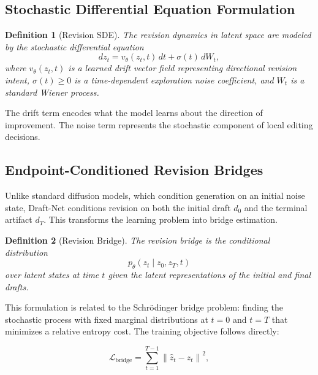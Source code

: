 \documentclass[12pt,a4paper]{article}
\theoremstyle{draftthm}
\newtheorem{definition}{Definition}[section]
\newcommand{\vtheta}{v_{\theta}}
\newcommand{\norm}[1]{\left\|#1\right\|}
\newcommand{\ptheta}{p_{\theta}}
\newcommand{\bW}{W}
\begin{document}
\subsection{Stochastic Differential Equation Formulation}

\begin{definition}[Revision SDE]
  The revision dynamics in latent space are modeled by the stochastic differential equation
  \begin{equation}
    dz_t = \vtheta(z_t, t)\, dt + \sigma(t)\, d\bW_t,
    \label{eq:revision-sde}
  \end{equation}
  where $\vtheta(z_t, t)$ is a learned drift vector field representing directional revision intent, $\sigma(t) \geq 0$ is a time-dependent exploration noise coefficient, and $\bW_t$ is a standard Wiener process.
\end{definition}

The drift term encodes what the model learns about the direction of improvement. The noise term represents the stochastic component of local editing decisions.

\subsection{Endpoint-Conditioned Revision Bridges}

Unlike standard diffusion models, which condition generation on an initial noise state, Draft-Net conditions revision on both the initial draft $d_0$ and the terminal artifact $d_T$. This transforms the learning problem into bridge estimation.

\begin{definition}[Revision Bridge]
  The \emph{revision bridge} is the conditional distribution
  \begin{equation}
    \ptheta(z_t \mid z_0, z_T, t)
  \end{equation}
  over latent states at time $t$ given the latent representations of the initial and final drafts.
\end{definition}

This formulation is related to the Schrödinger bridge problem: finding the stochastic process with fixed marginal distributions at $t=0$ and $t=T$ that minimizes a relative entropy cost. The training objective follows directly:

\begin{equation}
  \mathcal{L}_{\mathrm{bridge}}
  =
  \sum_{t=1}^{T-1}
  \norm{\hat{z}_t - z_t}^2,
  \label{eq:bridge-l2}
\end{equation}
\end{document}
